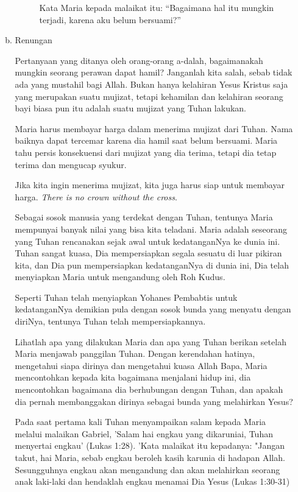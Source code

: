 \documentclass[a5paper,titlepage,12pt]{scrbook}
\begin{document}
\begin{itemize}
\begin{enumerate}[a.]
\begin{description}
				Kata Maria kepada malaikat itu: ``Bagaimana hal itu mungkin terjadi, karena aku belum bersuami?''
 
			\end{description}

		\item Renungan

Pertanyaan yang ditanya oleh orang-orang a-dalah, bagaimanakah mungkin seorang perawan dapat hamil?
Janganlah kita salah, sebab tidak ada yang mustahil bagi Allah. Bukan hanya kelahiran
Yesus Kristus saja yang merupakan suatu mujizat, tetapi kehamilan dan kelahiran seorang bayi
biasa pun itu adalah suatu mujizat yang Tuhan lakukan.

Maria harus membayar harga dalam menerima mujizat dari Tuhan. Nama baiknya dapat tercemar 
karena dia hamil saat belum bersuami. Maria tahu persis konsekuensi dari mujizat yang dia 
terima, tetapi dia tetap terima dan mengucap syukur.

Jika kita ingin menerima mujizat, kita juga harus siap untuk membayar harga. 
\textit{There is no crown without the cross}.

Sebagai sosok manusia yang terdekat dengan Tuhan, tentunya Maria mempunyai banyak nilai yang bisa kita teladani. 
Maria adalah seseorang yang Tuhan rencanakan sejak awal untuk kedatanganNya ke dunia ini. Tuhan sangat kuasa, Dia mempersiapkan segala sesuatu di luar pikiran kita, dan Dia pun mempersiapkan kedatanganNya di dunia ini, Dia telah menyiapkan Maria untuk mengandung oleh Roh Kudus. 

Seperti Tuhan telah menyiapkan Yohanes Pembabtis untuk kedatanganNya demikian pula dengan sosok bunda yang menyatu dengan diriNya, tentunya Tuhan telah mempersiapkannya.

Lihatlah apa yang dilakukan Maria dan apa yang Tuhan berikan setelah Maria menjawab panggilan Tuhan. 
Dengan kerendahan hatinya, mengetahui siapa dirinya dan mengetahui kuasa Allah Bapa, Maria mencontohkan kepada kita bagaimana menjalani hidup ini, dia mencontohkan bagaimana dia berhubungan dengan Tuhan, dan apakah dia pernah membanggakan dirinya sebagai bunda yang melahirkan Yesus? 

Pada saat pertama kali Tuhan menyampaikan salam kepada Maria melalui malaikan Gabriel, 'Salam hai engkau yang dikaruniai, Tuhan menyertai engkau' (Lukas 1:28). 'Kata malaikat itu kepadanya: "Jangan takut, hai Maria, sebab engkau beroleh kasih karunia di hadapan Allah. Sesungguhnya engkau akan mengandung dan akan melahirkan seorang anak laki-laki dan hendaklah engkau menamai Dia Yesus (Lukas 1:30-31) 


\end{enumerate}
\end{itemize}
\end{document}
